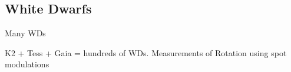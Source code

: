 {\color{red} \subsection{White Dwarfs}}
Many WDs 

K2 + Tess + Gaia = hundreds of WDs. Measurements of Rotation using spot modulations